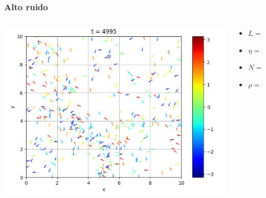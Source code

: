 \begin{frame}
\frametitle{Alto ruido}

\begin{columns}
    \begin{column}{0.7\textwidth}
      \begin{center}
{}
{\includegraphics[width=0.7\linewidth]{animation/high_noise/plot_1000.png}}
\end{center}
    \end{column}
    \begin{column}{0.3\textwidth}
\begin{center}
            \footnotesize
        \begin{itemize}
        \item \(L = 10\)
        \item \(\eta = 5\)
        \item \(N = 400\)
        \item \(\rho = 4\)
        \end{itemize}
\end{center}
    \end{column}
\end{columns}
\end{frame}















